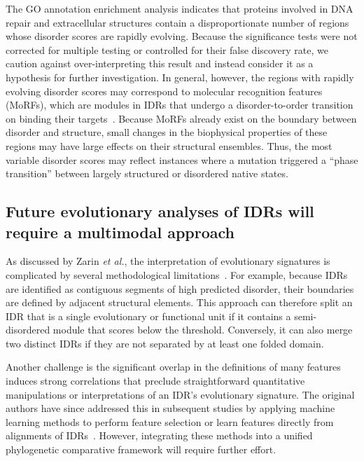 The GO annotation enrichment analysis indicates that proteins involved in DNA repair and extracellular structures contain a disproportionate number of regions whose disorder scores are rapidly evolving. Because the significance tests were not corrected for multiple testing or controlled for their false discovery rate, we caution against over-interpreting this result and instead consider it as a hypothesis for further investigation. In general, however, the regions with rapidly evolving disorder scores may correspond to molecular recognition features (MoRFs), which are modules in IDRs that undergo a disorder-to-order transition on binding their targets~\cite{Mohan2006, vanderLee2014}. Because MoRFs already exist on the boundary between disorder and structure, small changes in the biophysical properties of these regions may have large effects on their structural ensembles. Thus, the most variable disorder scores may reflect instances where a mutation triggered a ``phase transition'' between largely structured or disordered native states.

\subsection{Future evolutionary analyses of IDRs will require a multimodal approach}
As discussed by Zarin \textit{et al.}, the interpretation of evolutionary signatures is complicated by several methodological limitations~\cite{Zarin2019}. For example, because IDRs are identified as contiguous segments of high predicted disorder, their boundaries are defined by adjacent structural elements. This approach can therefore split an IDR that is a single evolutionary or functional unit if it contains a semi-disordered module that scores below the threshold. Conversely, it can also merge two distinct IDRs if they are not separated by at least one folded domain.


Another challenge is the significant overlap in the definitions of many features induces strong correlations that preclude straightforward quantitative manipulations or interpretations of an IDR's evolutionary signature. The original authors have since addressed this in subsequent studies by applying machine learning methods to perform feature selection or learn features directly from alignments of IDRs~\cite{Zarin2021, Lu2022}. However, integrating these methods into a unified phylogenetic comparative framework will require further effort.

